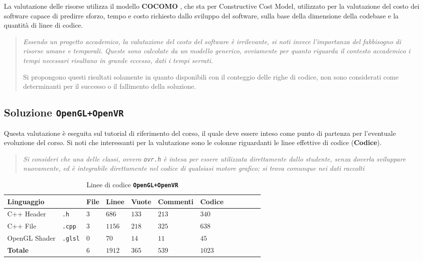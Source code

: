 \documentclass[a4paper, 11pt, twoside]{report}
\begin{document}
La valutazione delle risorse utilizza il modello \textbf{COCOMO} \cite{cocomo}, che sta per Constructive Cost Model,
utilizzato per la valutazione del costo dei software capace di predirre sforzo, tempo e costo richiesto dallo sviluppo
del software, sulla base della dimensione della codebase e la quantità di linee di codice.

\begin{quote}
\itshape
Essendo un progetto accademico, la valutazione del costo del software è irrilevante, si noti invece l'importanza del
fabbisogno di risorse umane e temporali.
Queste sono calcolate da un modello generico, ovviamente per quanto riguarda il contesto accademico i tempi necessari
risultano in grande eccesso, dati i tempi serrati.

Si propongono questi risultati solamente in quanto disponibili con il conteggio delle righe di codice, non sono
considerati come determinanti per il successo o il fallimento della soluzione.
\end{quote}

\subsection{Soluzione \textcolor{blue!40}{\texttt{OpenGL+OpenVR}}}

Questa valutazione è eseguita sul tutorial di riferimento del corso, il quale deve essere inteso come punto di partenza
per l'eventuale evoluzione del corso. Si noti che interessanti per la valutazione sono le colonne riguardanti le linee
effettive di codice (\textbf{Codice}).

\begin{quote}
\itshape
Si consideri che una delle classi, ovvero \texttt{ovr.h} è intesa per essere utilizzata direttamente dallo studente,
senza doverla sviluppare nuovamente, ed è integrabile direttamente nel codice di qualsiasi motore grafico; si trova
comunque nei dati raccolti
\end{quote}

\begin{table}[h]
\centering
\caption{Linee di codice \textcolor{blue!40}{\textbf{\texttt{OpenGL+OpenVR}}}}
\begin{tabular}{lp{2cm}lp{1cm}lp{2cm}lp{1cm}lp{1.3cm}lp{1cm}}
\toprule
\textbf{Linguaggio} &
                    &
\textbf{File}       &
\textbf{Linee}      &
\textbf{Vuote}      &
\textbf{Commenti}   &
\textbf{Codice}                                                          \\
\midrule
C++ Header      & \texttt{.h}    &  $3$ &  $686$ & $133$ & $213$ & $340$ \\
C++ File        & \texttt{.cpp}  &  $3$ & $1156$ & $218$ & $325$ & $638$ \\
OpenGL Shader   & \texttt{.glsl} &  $0$ &   $70$ &  $14$ &  $11$ &  $45$ \\
\midrule
\textbf{Totale} &                &  $6$ & $1912$ & $365$ & $539$ & \textcolor{blue!40}{$1023$} \\
\bottomrule
\end{tabular}
\end{table}
\end{document}
